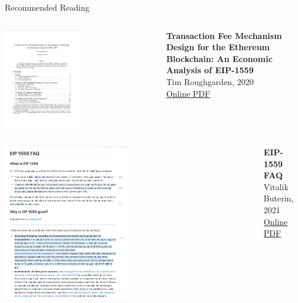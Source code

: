 \documentclass[handout]{beamer}
\begin{document}
\begin{frame}{Recommended Reading}
\begin{columns}
	\begin{column}{0.3\textwidth}
	\center
	\includegraphics[width=0.5\textwidth , frame]{../assets/images/Roughgarden_cover.png}
	\end{column}
	\begin{column}{0.7\textwidth}
	\textbf{Transaction Fee Mechanism Design for the Ethereum Blockchain: An Economic Analysis of EIP-1559} \\
	Tim Roughgarden, 2020 \\
	\link \href{https://timroughgarden.org/papers/eip1559.pdf}{Online PDF}
	\end{column}
\end{columns}
\begin{columns}
	\begin{column}{0.3\textwidth}
	\center
	\includegraphics[width=0.5\textwidth , frame]{../assets/images/eip_1559_cover.png}
	\end{column}
	\begin{column}{0.7\textwidth}
	\textbf{EIP-1559 FAQ} \\
	Vitalik Buterin, 2021 \\
	\link \href{https://notes.ethereum.org/@vbuterin/eip-1559-faq}{Online PDF}
	\end{column}
\end{columns}
\end{frame}
\end{document}

